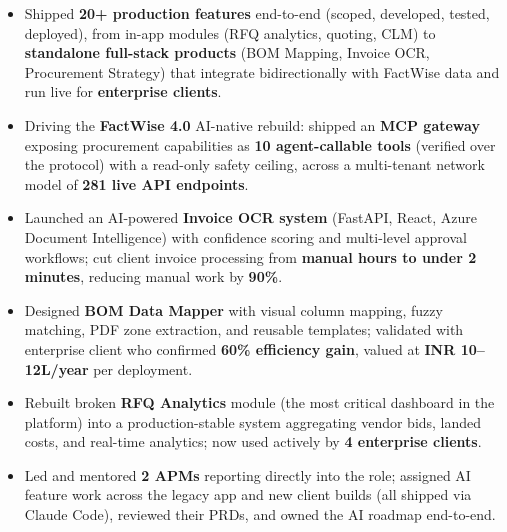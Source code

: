 \documentclass[10pt,a4paper]{article}
\begin{document}
\begin{itemize}[noitemsep]
    \item Shipped \textbf{20+ production features} end-to-end (scoped, developed, tested, deployed), from in-app modules (RFQ analytics, quoting, CLM) to \textbf{standalone full-stack products} (BOM Mapping, Invoice OCR, Procurement Strategy) that integrate bidirectionally with FactWise data and run live for \textbf{enterprise clients}.
    \item Driving the \textbf{FactWise 4.0} AI-native rebuild: shipped an \textbf{MCP gateway} exposing procurement capabilities as \textbf{10 agent-callable tools} (verified over the protocol) with a read-only safety ceiling, across a multi-tenant network model of \textbf{281 live API endpoints}.
    \item Launched an AI-powered \textbf{Invoice OCR system} (FastAPI, React, Azure Document Intelligence) with confidence scoring and multi-level approval workflows; cut client invoice processing from \textbf{manual hours to under 2 minutes}, reducing manual work by \textbf{90\%}.
    \item Designed \textbf{BOM Data Mapper} with visual column mapping, fuzzy matching, PDF zone extraction, and reusable templates; validated with enterprise client who confirmed \textbf{60\% efficiency gain}, valued at \textbf{INR 10--12L/year} per deployment.
    \item Rebuilt broken \textbf{RFQ Analytics} module (the most critical dashboard in the platform) into a production-stable system aggregating vendor bids, landed costs, and real-time analytics; now used actively by \textbf{4 enterprise clients}.
    \item Led and mentored \textbf{2 APMs} reporting directly into the role; assigned AI feature work across the legacy app and new client builds (all shipped via Claude Code), reviewed their PRDs, and owned the AI roadmap end-to-end.
\end{itemize}
\end{document}
